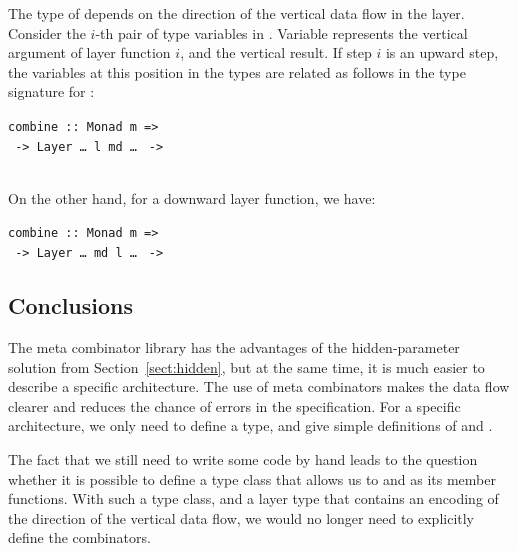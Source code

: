 \documentclass[preprint,natbib]{sigplanconf}
\begin{document}
The type of  depends on the direction of the vertical data flow in the layer. Consider the $i$-th pair of  type variables in . Variable  represents the vertical argument of layer function $i$, and  the vertical result. If step $i$ is an upward step, the variables at this position in the  types are related as follows in the type signature for :

\begin{small}
\begin{tabbing}
{\tt  combine :: }\={\tt Monad m =>}\\
                  \verb| -> |{\tt Layer \dots~l~md \dots} \verb| ->|\\
                  \\
\end{tabbing}
\end{small}

On the other hand, for a downward layer function, we have:

\begin{small}
\begin{tabbing}
{\tt  combine :: }\={\tt Monad m =>}\\
                  \verb| -> |{\tt Layer \dots~md l \dots} \verb| ->|\\
\end{tabbing}
\end{small}


\subsection{Conclusions} 

The meta combinator library has the advantages of the hidden-parameter solution from Section~\ref{sect:hidden}, but at the same time, it is much easier to describe a specific architecture. The use of meta combinators makes the data flow clearer and reduces the chance of errors in the specification. For a specific architecture, we only need to define a  type, and give simple definitions of  and .

The fact that we still need to write some code by hand leads to the question whether it is possible to define a type class that allows us to   and  as its member functions. With such a type class, and a layer type that contains an encoding of the direction of the vertical data flow, we would no longer need to explicitly define the combinators.
\end{document}
